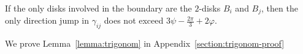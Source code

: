 \begin{enumerate}[label={\bf Case \arabic*: }, wide, labelwidth=!, labelindent=0pt]
\begin{lemma}\label{lemma:trigonom}
If the only disks involved in the boundary are the $2$-disks $B_i$ and $B_j$, then the only direction jump in $\gamma_{ij}$ does not exceed
$3\psi - \frac{2\pi}{3} + 2\varphi$.
\end{lemma}

We prove Lemma~\ref{lemma:trigonom} in Appendix~\ref{section:trigonom-proof}







\end{enumerate}
